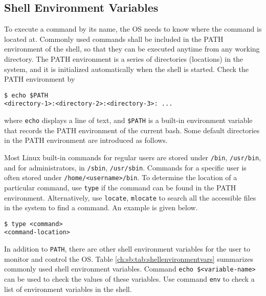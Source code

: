 \subsection{Shell Environment Variables}\label{ch:sb:subsec:shellenvvar}

To execute a command by its name, the OS needs to know where the command is located at. Commonly used commands shall be included in the PATH environment of the shell, so that they can be executed anytime from any working directory. The PATH environment is a series of directories (locations) in the system, and it is initialized automatically when the shell is started. Check the PATH environment by
\begin{lstlisting}
$ echo $PATH
<directory-1>:<directory-2>:<directory-3>: ...
\end{lstlisting}
where \verb|echo| displays a line of text, and \verb|$PATH| is a built-in environment variable that records the PATH environment of the current bash. Some default directories in the PATH environment are introduced as follows.

Most Linux built-in commands for regular users are stored under \verb|/bin|, \verb|/usr/bin|, and for administrators, in \verb|/sbin|, \verb|/usr/sbin|. Commands for a specific user is often stored under \verb|/home/<username>/bin|. To determine the location of a particular command, use \verb|type| if the command can be found in the PATH environment. Alternatively, use \verb|locate|, \verb|mlocate| to search all the accessible files in the system to find a command. An example is given below.
\begin{lstlisting}
$ type <command>
<command-location>
\end{lstlisting}

In addition to \verb|PATH|, there are other shell environment variables for the user to monitor and control the OS. Table \ref{ch:sb:tab:shellenvironmentvars} summarizes commonly used shell environment variables. Command \verb|echo $<variable-name>| can be used to check the values of these variables. Use command \verb|env| to check a list of environment variables in the shell.

